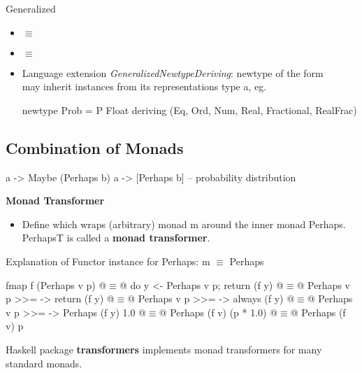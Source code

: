 Generalized 
\begin{itemize}
    \item {} $\equiv$ 
    \item {} $\equiv$ 
\end{itemize}

\begin{itemize}
    \item Language extension \emph{GeneralizedNewtypeDeriving}: newtype of the form \\  may inherit instances from its representations type a, eg.
    \begin{codebox}[haskell]
    newtype Prob = P Float
        deriving (Eq, Ord, Num, Real, Fractional, RealFrac)
    \end{codebox}
\end{itemize}



\subsection{Combination of Monads}

\begin{codebox}[haskell]
a -> Maybe (Perhaps b)
a -> [Perhaps b] -- probability distribution
\end{codebox}


\textbf{Monad Transformer}
\begin{itemize}
    \item Define  which wraps (arbitrary) monad m around the inner monad Perhaps. PerhapsT is called a \textbf{monad transformer}.
\end{itemize}



Explanation of Functor instance for Perhaps:
m $\equiv$ Perhaps

\begin{codebox}[haskell]
  fmap f (Perhaps v p)
@$\equiv$@ do y <- Perhaps v p; return (f y)
@$\equiv$@ Perhaps v p >>= \y -> return (f y)
@$\equiv$@ Perhaps v p >>= \y -> always (f y)
@$\equiv$@ Perhaps v p >>= \y -> Perhaps (f y) 1.0
@$\equiv$@ Perhaps (f v) (p * 1.0)
@$\equiv$@ Perhaps (f v) p
\end{codebox}

Haskell package \textbf{transformers} implements monad transformers for many standard monads.
















